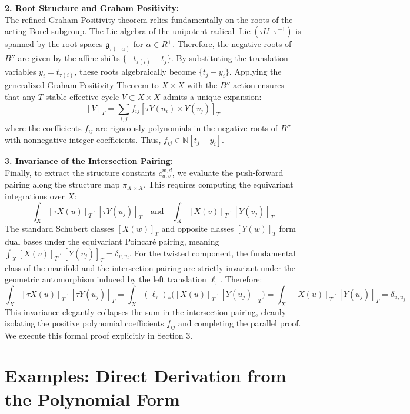 \documentclass{amsart}
\theoremstyle{definition}
\begin{document}
\vspace{2mm}
\noindent\textbf{2. Root Structure and Graham Positivity:}\\
The refined Graham Positivity theorem relies fundamentally on the roots of the acting Borel subgroup. The Lie algebra of the unipotent radical $\operatorname{Lie}(\tau U^- \tau^{-1})$ is spanned by the root spaces $\mathfrak{g}_{\tau(-\alpha)}$ for $\alpha \in R^+$. Therefore, the negative roots of $B''$ are given by the affine shifts $\{ -t_{\tau(i)} + t_j \}$. 
By substituting the translation variables $y_i = t_{\tau(i)}$, these roots algebraically become $\{ t_j - y_i \}$. Applying the generalized Graham Positivity Theorem \cite{GaoXiong2023} to $X \times X$ with the $B''$ action ensures that any $T$-stable effective cycle $V \subset X \times X$ admits a unique expansion:
$$ [V]_T = \sum_{i,j} f_{ij} [\tau Y(u_i) \times Y(v_j)]_T $$
where the coefficients $f_{ij}$ are rigorously polynomials in the negative roots of $B''$ with nonnegative integer coefficients. Thus, $f_{ij} \in \mathbb{N}[t_j - y_i]$.

\vspace{2mm}
\noindent\textbf{3. Invariance of the Intersection Pairing:}\\
Finally, to extract the structure constants $c_{u,v}^{w,d}$, we evaluate the push-forward pairing along the structure map $\pi_{X \times X}$. This requires computing the equivariant integrations over $X$:
$$ \int_X [\tau X(u)]_T \cdot [\tau Y(u_j)]_T \quad \text{and} \quad \int_X [X(v)]_T \cdot [Y(v_j)]_T $$
The standard Schubert classes $[X(w)]_T$ and opposite classes $[Y(w)]_T$ form dual bases under the equivariant Poincaré pairing, meaning $\int_X [X(v)]_T \cdot [Y(v_j)]_T = \delta_{v, v_j}$. 
For the twisted component, the fundamental class of the manifold and the intersection pairing are strictly invariant under the geometric automorphism induced by the left translation $\ell_\tau$. Therefore:
$$ \int_X [\tau X(u)]_T \cdot [\tau Y(u_j)]_T = \int_X (\ell_\tau)_*\big([X(u)]_T \cdot [Y(u_j)]_T\big) = \int_X [X(u)]_T \cdot [Y(u_j)]_T = \delta_{u, u_j} $$
This invariance elegantly collapses the sum in the intersection pairing, cleanly isolating the positive polynomial coefficients $f_{ij}$ and completing the parallel proof. We execute this formal proof explicitly in Section 3.

\section{Examples: Direct Derivation from the Polynomial Form}
\end{document}
